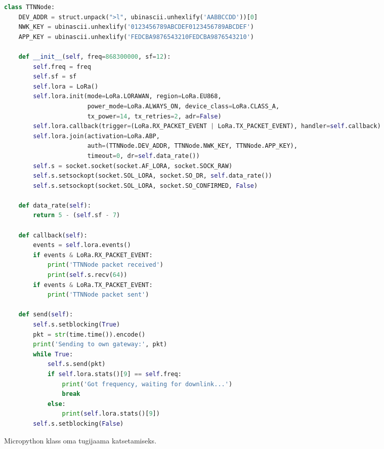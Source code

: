 \documentclass[12pt]{article}
\begin{document}
    \begin{figure}[h]
    \begin{spacing}{0.8}
        \begin{lstlisting}[language=Python]
class TTNNode:
    DEV_ADDR = struct.unpack(">l", ubinascii.unhexlify('AABBCCDD'))[0]
    NWK_KEY = ubinascii.unhexlify('0123456789ABCDEF0123456789ABCDEF')
    APP_KEY = ubinascii.unhexlify('FEDCBA9876543210FEDCBA9876543210')

    def __init__(self, freq=868300000, sf=12):
        self.freq = freq
        self.sf = sf
        self.lora = LoRa()
        self.lora.init(mode=LoRa.LORAWAN, region=LoRa.EU868,
                       power_mode=LoRa.ALWAYS_ON, device_class=LoRa.CLASS_A,
                       tx_power=14, tx_retries=2, adr=False)
        self.lora.callback(trigger=(LoRa.RX_PACKET_EVENT | LoRa.TX_PACKET_EVENT), handler=self.callback)
        self.lora.join(activation=LoRa.ABP,
                       auth=(TTNNode.DEV_ADDR, TTNNode.NWK_KEY, TTNNode.APP_KEY),
                       timeout=0, dr=self.data_rate())
        self.s = socket.socket(socket.AF_LORA, socket.SOCK_RAW)
        self.s.setsockopt(socket.SOL_LORA, socket.SO_DR, self.data_rate())
        self.s.setsockopt(socket.SOL_LORA, socket.SO_CONFIRMED, False)

    def data_rate(self):
        return 5 - (self.sf - 7)

    def callback(self):
        events = self.lora.events()
        if events & LoRa.RX_PACKET_EVENT:
            print('TTNNode packet received')
            print(self.s.recv(64))
        if events & LoRa.TX_PACKET_EVENT:
            print('TTNNode packet sent')

    def send(self):
        self.s.setblocking(True)
        pkt = str(time.time()).encode()
        print('Sending to own gateway:', pkt)
        while True:
            self.s.send(pkt)
            if self.lora.stats()[9] == self.freq:
                print('Got frequency, waiting for downlink...')
                break
            else:
                print(self.lora.stats()[9])
        self.s.setblocking(False)

    \end{lstlisting}
    \end{spacing}
    \caption{Micropython klass oma tugijaama katsetamiseks.}
    \label{fig:codettn}
    \end{figure}

    \clearpage
\end{document}
